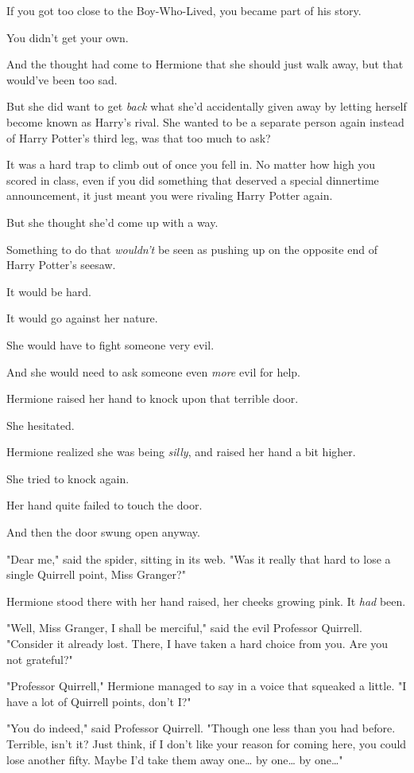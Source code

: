 If you got too close to the Boy-Who-Lived, you became part of his story.

You didn't get your own.

And the thought had come to Hermione that she should just walk away, but that
would've been too sad.

But she did want to get \emph{back} what she'd accidentally given away by
letting herself become known as Harry's rival. She wanted to be a separate
person again instead of Harry Potter's third leg, was that too much to ask?

It was a hard trap to climb out of once you fell in. No matter how high you
scored in class, even if you did something that deserved a special dinnertime
announcement, it just meant you were rivaling Harry Potter again.

But she thought she'd come up with a way.

Something to do that \emph{wouldn't} be seen as pushing up on the opposite end
of Harry Potter's seesaw.

It would be hard.

It would go against her nature.

She would have to fight someone very evil.

And she would need to ask someone even \emph{more} evil for help.

Hermione raised her hand to knock upon that terrible door.

She hesitated.

Hermione realized she was being \emph{silly}, and raised her hand a bit higher.

She tried to knock again.

Her hand quite failed to touch the door.

And then the door swung open anyway.

"Dear me," said the spider, sitting in its web. "Was it really that hard to
lose a single Quirrell point, Miss Granger?"

Hermione stood there with her hand raised, her cheeks growing pink. It
\emph{had} been.

"Well, Miss Granger, I shall be merciful," said the evil Professor Quirrell.
"Consider it already lost. There, I have taken a hard choice from you. Are you
not grateful?"

"Professor Quirrell," Hermione managed to say in a voice that squeaked a
little. "I have a lot of Quirrell points, don't I?"

"You do indeed," said Professor Quirrell. "Though one less than you had before.
Terrible, isn't it? Just think, if I don't like your reason for coming here,
you could lose another fifty. Maybe I'd take them away one{\ldots} by
one{\ldots} by one{\ldots}"

